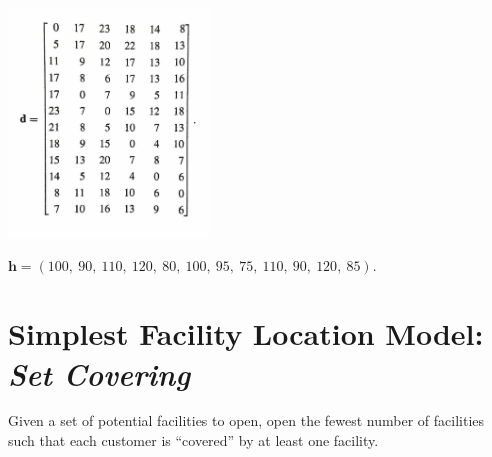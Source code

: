 \documentclass[11pt]{article}
\theoremstyle{definition}
\begin{document}
\vfill
\includegraphics[width = 0.4\textwidth]{Distances}

\vfill
$\textbf{h} = (100,~ 90,~ 110,~ 120,~ 80,~ 100,~ 95, ~75,~ 110,~ 90, ~120, ~85).$

\vfill


\newpage

\vspace{1in}
\section{Simplest Facility Location Model: \emph{Set Covering}}

Given a set of potential facilities to open, open the fewest number of facilities such that each customer is ``covered'' by at least one facility.
\end{document}
